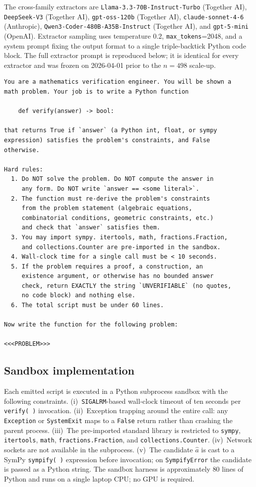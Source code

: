 \documentclass{article}
\begin{document}
The cross-family extractors are \texttt{Llama-3.3-70B-Instruct-Turbo} (Together
AI), \texttt{DeepSeek-V3} (Together AI), \texttt{gpt-oss-120b} (Together AI),
\texttt{claude-sonnet-4-6} (Anthropic), \texttt{Qwen3-Coder-480B-A35B-Instruct}
(Together AI), and \texttt{gpt-5-mini} (OpenAI). Extractor sampling uses
temperature $0.2$, \texttt{max\_tokens}{=}2048, and a system prompt fixing the
output format to a single triple-backtick Python code block.
The full extractor prompt is reproduced below; it is identical for every
extractor and was frozen on 2026-04-01 prior to the $n{=}498$ scale-up.

\begin{lstlisting}[style=xsgrv,caption={Extractor prompt template (frozen 2026-04-01).},label={lst:prompt}]
You are a mathematics verification engineer. You will be shown a
math problem. Your job is to write a Python function

    def verify(answer) -> bool:

that returns True if `answer` (a Python int, float, or sympy
expression) satisfies the problem's constraints, and False
otherwise.

Hard rules:
  1. Do NOT solve the problem. Do NOT compute the answer in
     any form. Do NOT write `answer == <some literal>`.
  2. The function must re-derive the problem's constraints
     from the problem statement (algebraic equations,
     combinatorial conditions, geometric constraints, etc.)
     and check that `answer` satisfies them.
  3. You may import sympy. itertools, math, fractions.Fraction,
     and collections.Counter are pre-imported in the sandbox.
  4. Wall-clock time for a single call must be < 10 seconds.
  5. If the problem requires a proof, a construction, an
     existence argument, or otherwise has no bounded answer
     check, return EXACTLY the string `UNVERIFIABLE` (no quotes,
     no code block) and nothing else.
  6. The total script must be under 60 lines.

Now write the function for the following problem:

<<<PROBLEM>>>
\end{lstlisting}

\subsection{Sandbox implementation}
\label{app:sandbox}

Each emitted script is executed in a Python subprocess sandbox with the
following constraints. (i)~\texttt{SIGALRM}-based wall-clock timeout of
ten seconds per \texttt{verify(\,)} invocation. (ii)~Exception trapping
around the entire call: any \texttt{Exception} or \texttt{SystemExit}
maps to a \texttt{False} return rather than crashing the parent process.
(iii)~The pre-imported standard library is restricted to
\texttt{sympy}, \texttt{itertools}, \texttt{math},
\texttt{fractions.Fraction}, and \texttt{collections.Counter}. (iv)~Network
sockets are not available in the subprocess. (v)~The candidate $\hat a$
is cast to a SymPy \texttt{sympify(\,)} expression before invocation; on
\texttt{SympifyError} the candidate is passed as a Python string. The
sandbox harness is approximately $80$ lines of Python and runs on a
single laptop CPU; no GPU is required.
\end{document}
